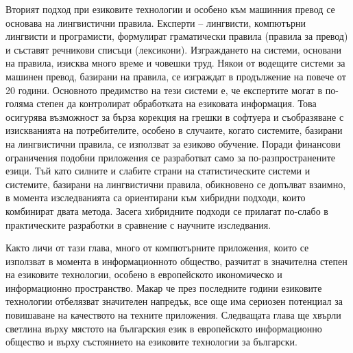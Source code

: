 \begin{multicols}{2}
  Вторият подход при езиковите технологии и особено към машинния превод се основава на лингвистични правила. Експерти -- лингвисти, компютърни лингвисти и програмисти, формулират  граматически правила (правила за превод) и съставят
   речникови списъци (лексикони). Изграждането на системи, основани на правила, изисква много време и човешки труд. 
  Някои от водещите системи за машинен превод, базирани на правила, се
   изграждат в продължение на повече от 20 години. Основното предимство
   на тези системи е, че експертите могат в по-голяма степен да контролират обработката на езиковата информация. 
  Това осигурява възможност за бърза корекция на грешки в софтуера и
  съобразяване с изискванията на потребителите, особено в случаите, когато системите, базирани на лингвистични правила, се използват за езиково обучение.
  Поради финансови ограничения подобни приложения се разработват само за
  по-разпространените езици.
  Тъй като силните и слабите страни на статистическите системи и системите, базирани на лингвистични правила, обикновено се допълват взаимно, в момента изследванията са ориентирани към хибридни подходи, които комбинират  двата метода. Засега хибридните подходи се прилагат по-слабо в практическите разработки в сравнение с научните изследвания. 

  Както личи от тази глава, много от компютърните приложения, които се използват в момента в информационното общество, разчитат в значителна степен на езиковите технологии, особено в европейското икономическо и информационно пространство. Макар че през последните години езиковите технологии отбелязват значителен напредък, все още има сериозен потенциал за повишаване на  качеството на техните приложения. Следващата глава ще хвърли светлина върху мястото на българския език в европейското информационно общество и върху състоянието на езиковите технологии за български.  
  \end{multicols}

  \clearpage


